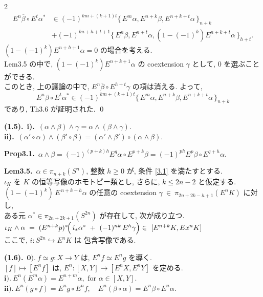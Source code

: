 \documentclass[10pt, leqno]{ltjsarticle}
\newcommand{\into}{\hookrightarrow}
\newcommand{\Ex}{E}        %
\newcommand{\todai}[2][]{\{\,#2\,\}_{#1}}      %
\newcommand{\pis}[2]{\pi_{#1}(#2)}       %
\newcommand{\ext}[1]{\overline{#1}}     %
\numberwithin{equation}{section}
\theoremstyle{plain}
\theoremstyle{definition}
\theoremstyle{remark}
\begin{document}
\begin{paracol}{2}
\[
\begin{align*}
\Ex^{n}\ext{\beta}\circ \Ex^{t}\alpha^{*}
&\in (-1)^{km+(k+1)t}\todai[n+k]{\Ex^{m}\alpha, \Ex^{n+k}\beta, E^{n+k+t}\alpha}\\
&+ (-1)^{kn+h+t+1}\todai[h+t]{E^n\beta, E^{n+t}\alpha, (1-(-1)^k)E^{n+k+t}\alpha} .
\end{align*}
\]
$(1-(-1)^k)\Ex^{n+h+1}\alpha=0$ の場合を考える. \\
Lem3.5 の中で, 
\((1-(-1)^k)E^{n+k+1}\alpha\) の coextension \(\gamma\) 
として, \(0\) を選ぶことができる. \\ 
このとき, 上の議論の中で, \(E^n\ext{\beta}\circ E^{h+t}\gamma\) の項は消える. 
よって, 
\[
E^n\beta\circ E^t\alpha^{*}
\in (-1)^{km+(k+1)t}\todai[n+k]{E^m\alpha, E^{n+k}\beta, E^{n+k+t}\alpha}
\]
であり, Th3.6 が証明された. 
\qed

\switchcolumn

\noindent
\textbf{(1.5).}\
\textbf{i).}\ \((\alpha\wedge\beta)\wedge\gamma 
  = \alpha\wedge(\beta\wedge\gamma).\)\\
\textbf{ii).}\ \((\alpha'\circ\alpha)\wedge(\beta'\circ\beta)
  = (\alpha'\wedge\beta')\circ(\alpha\wedge\beta).\)

\noindent
\textbf{Prop3.1.}\
\(
\alpha \wedge \beta
= (-1)^{(p+k)h} E^{q}\alpha \circ E^{p+k}\beta
= (-1)^{ph} E^{p}\beta \circ E^{q+h}\alpha .
\)

\noindent
\textbf{Lem3.5.}\
$\alpha\in\pis{n+k}{S^n}$, 整数 $h\ge0$ が, 
条件 \eqref{3.1} を満たすとする. \\
$\iota_K$ を $K$ の恒等写像のホモトピー類とし, 
さらに, $k\le 2n-2$ と仮定する. \\
\((1-(-1)^k)\,\Ex^{\,n+k-h}\alpha\) の任意の coextension
\(\gamma\ \in\ \pis{2n+2k-h+1}{\Ex^{n}K}\)
に対し, \\
ある元 $\alpha^{*}\in\pis{2n+2k+1}{S^{2n}}$ が存在して,
次が成り立つ.\\
\(
\iota_K \wedge \alpha
\;=\; (\Ex^{n+k}p)^{*}\!\Bigl(\, i_*\alpha^{*}\ +\ (-1)^{nk}\,\Ex^{h}\gamma \Bigr)
\in\ [\Ex^{n+k}K, Ex^{n}K]
\)\\
ここで, $i:S^{2n}\into\Ex^{n}K$ は 包含写像である. 

\noindent
\textbf{(1.6).}\
\(\textbf{0).}\ 
f\simeq g:X\to Y \text{ は, }
E^n f\simeq E^n g \text{ を導く.}\)\\
\([f]\mapsto [E^n f] \text{ は, } 
E^n : [X,Y] \to [E^n X, E^n Y] \text{ を定める.}\)\\
\(\textbf{i).}\ 
E^n(E^m\alpha) = E^{n+m}\alpha,
\text{ for } \alpha\in [X,Y].\)\\
\(\textbf{ii).}\
E^n(g\circ f) = E^n g\circ E^n f,\quad
E^n(\beta\circ\alpha) = E^n\beta\circ E^n\alpha.\)


\end{paracol}
\end{document}

